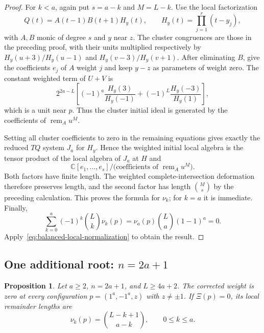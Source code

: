 \documentclass[11pt]{article}
\newtheorem{proposition}{Proposition}[section]
\theoremstyle{definition}
\newcommand{\C}{\mathbb C}
\begin{document}
\begin{proof}
For $k<a$, again put $s=a-k$ and $M=L-k$. Use the local factorization
\[
 Q(t)=A(t-1)B(t+1)H_y(t),\qquad
 H_y(t)=\prod_{j=1}^r(t-y_j),
\]
with $A,B$ monic of degree $s$ and $y$ near $z$. The cluster
congruences are those in the preceding proof, with their units
multiplied respectively by
$H_y(u+3)/H_y(u-1)$ and $H_y(v-3)/H_y(v+1)$.
After eliminating $B$, give the coefficients $e_j$ of $A$ weight $j$
and keep $y-z$ as parameters of weight zero. The constant weighted
term of $U+V$ is
\[
 2^{2a-L}\left[(-1)^a\frac{H_y(3)}{H_y(-1)}
                  +(-1)^L\frac{H_y(-3)}{H_y(1)}\right],
\]
which is a unit near $p$. Thus the cluster initial ideal is generated
by the coefficients of $\operatorname{rem}_A u^M$.

Setting all cluster coefficients to zero in the remaining equations
gives exactly the reduced $TQ$ system $J_a$ for $H_y$. Hence the
weighted initial local algebra is the tensor product of the local
algebra of $J_a$ at $H$ and
\[
 \C[e_1,\ldots,e_s]\big/
 \bigl(\text{coefficients of }\operatorname{rem}_A u^M\bigr).
\]
Both factors have finite length. The weighted complete-intersection
deformation therefore preserves length, and the second factor has
length $\binom Ms$ by the preceding calculation. This proves the
formula for $\nu_k$; for $k=a$ it is immediate. Finally,
\[
 \sum_{k=0}^a(-1)^k\binom Lk\nu_k(p)
 =\nu_a(p)\binom La(1-1)^a=0.
\]
Apply~\eqref{eq:balanced-local-normalization} to obtain the result.
\end{proof}

\subsection{One additional root: $n=2a+1$}

\begin{proposition}\label{prop:balanced-one-additional-root}
Let $a\ge2$, $n=2a+1$, and $L\ge4a+2$. The corrected weight is zero
at every configuration $p=(1^a,-1^a,z)$ with $z\ne\pm1$.
If $\Xi(p)=0$, its local remainder lengths are
\[
 \nu_k(p)=\binom{L-k+1}{a-k},\qquad 0\le k\le a.
\]
\end{proposition}
\end{document}
